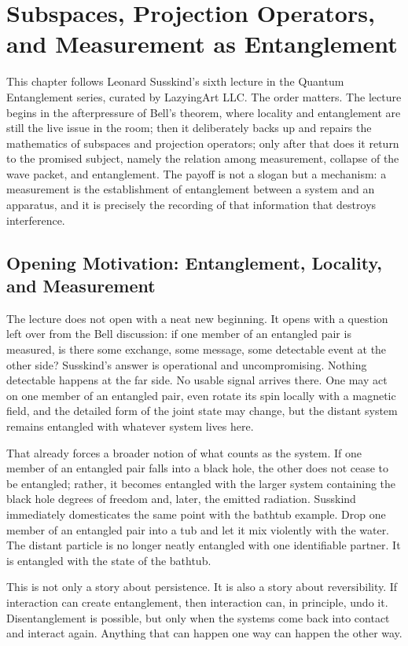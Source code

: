 \chapter{Subspaces, Projection Operators, and Measurement as Entanglement}

This chapter follows Leonard Susskind's sixth lecture in the Quantum Entanglement series, curated by LazyingArt LLC. The order matters. The lecture begins in the afterpressure of Bell's theorem, where locality and entanglement are still the live issue in the room; then it deliberately backs up and repairs the mathematics of subspaces and projection operators; only after that does it return to the promised subject, namely the relation among measurement, collapse of the wave packet, and entanglement. The payoff is not a slogan but a mechanism: a measurement is the establishment of entanglement between a system and an apparatus, and it is precisely the recording of that information that destroys interference.

\section{Opening Motivation: Entanglement, Locality, and Measurement}

The lecture does not open with a neat new beginning. It opens with a question left over from the Bell discussion: if one member of an entangled pair is measured, is there some exchange, some message, some detectable event at the other side? Susskind's answer is operational and uncompromising. Nothing detectable happens at the far side. No usable signal arrives there. One may act on one member of an entangled pair, even rotate its spin locally with a magnetic field, and the detailed form of the joint state may change, but the distant system remains entangled with whatever system lives here.

That already forces a broader notion of what counts as the system. If one member of an entangled pair falls into a black hole, the other does not cease to be entangled; rather, it becomes entangled with the larger system containing the black hole degrees of freedom and, later, the emitted radiation. Susskind immediately domesticates the same point with the bathtub example. Drop one member of an entangled pair into a tub and let it mix violently with the water. The distant particle is no longer neatly entangled with one identifiable partner. It is entangled with the state of the bathtub.

This is not only a story about persistence. It is also a story about reversibility. If interaction can create entanglement, then interaction can, in principle, undo it. Disentanglement is possible, but only when the systems come back into contact and interact again. Anything that can happen one way can happen the other way.

